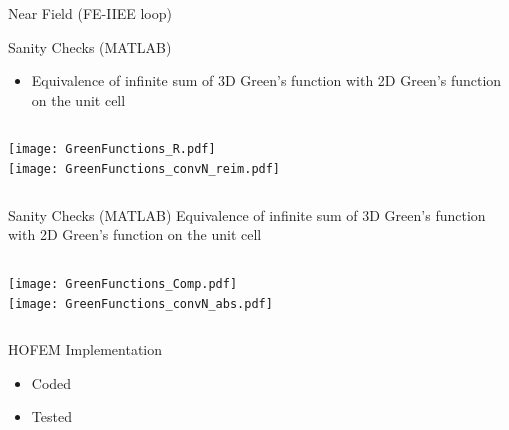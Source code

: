 
\begin{frame}[allowframebreaks]{Near Field (FE-IIEE loop)}
  
  \begin{block}{Sanity Checks (MATLAB)}
    \begin{itemize}
    \item Equivalence of infinite sum of 3D Green's function with 2D
      Green's function on the unit cell 
  \end{itemize}
    \begin{columns}%
      \texttt{[image: GreenFunctions\_R.pdf]} \\
      \texttt{[image: GreenFunctions\_convN\_reim.pdf]} \\
    \end{columns}
  \end{block}

  \framebreak %

  \begin{block}{Sanity Checks (MATLAB)}
    Equivalence of infinite sum of 3D Green's function with 2D Green's
    function on the unit cell
    \begin{columns}%
       \texttt{[image: GreenFunctions\_Comp.pdf]} \\
      \texttt{[image: GreenFunctions\_convN\_abs.pdf]} \\
    \end{columns}
  \end{block}

  \framebreak %

  \begin{block}{HOFEM Implementation}

    \begin{itemize}
    \item Coded
    \item Tested
    \end{itemize}
    

\end{block}
\end{frame}
